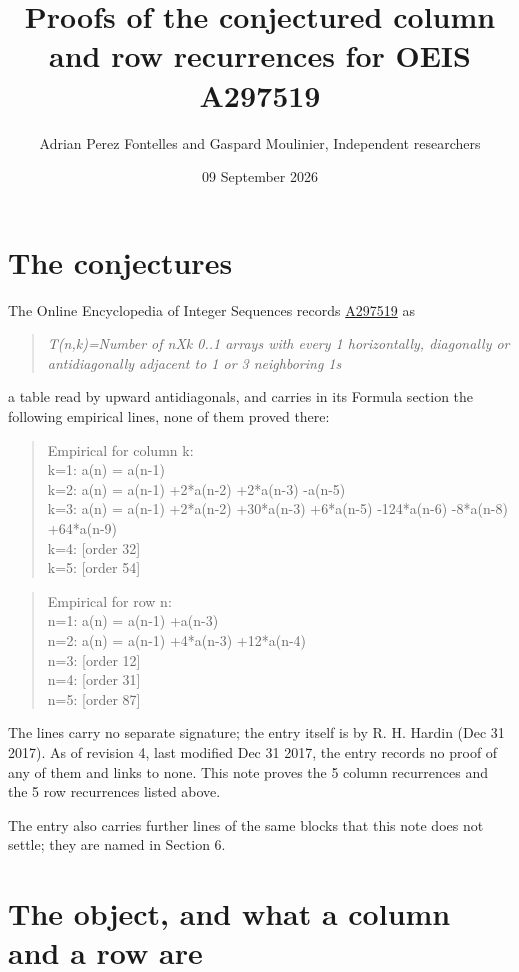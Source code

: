 \documentclass[11pt]{article}
\title{Proofs of the conjectured column and row recurrences for OEIS A297519}
\author{Adrian Perez Fontelles and Gaspard Moulinier, Independent researchers}
\date{09 September 2026}
\theoremstyle{definition}
\begin{document}
\maketitle
\section{The conjectures}

The Online Encyclopedia of Integer Sequences records \href{https://oeis.org/A297519}{A297519} as

\begin{quote}\itshape T(n,k)=Number of nXk 0..1 arrays with every 1 horizontally, diagonally or antidiagonally adjacent to 1 or 3 neighboring 1s\end{quote}

a table read by upward antidiagonals, and carries in its Formula section the following empirical lines, none of them proved there:

\begin{quote}\ttfamily Empirical for column k:\\
k=1: a(n) = a(n-1)\\k=2: a(n) = a(n-1) +2*a(n-2) +2*a(n-3) -a(n-5)\\k=3: a(n) = a(n-1) +2*a(n-2) +30*a(n-3) +6*a(n-5) -124*a(n-6) -8*a(n-8) +64*a(n-9)\\k=4: [order 32]\\k=5: [order 54]\end{quote}

\begin{quote}\ttfamily Empirical for row n:\\
n=1: a(n) = a(n-1) +a(n-3)\\n=2: a(n) = a(n-1) +4*a(n-3) +12*a(n-4)\\n=3: [order 12]\\n=4: [order 31]\\n=5: [order 87]\end{quote}

The lines carry no separate signature; the entry itself is by R. H. Hardin (Dec 31 2017). As of revision 4, last modified Dec 31 2017, the entry records no proof of any of them and links to none. This note proves the 5 column recurrences and the 5 row recurrences listed above.

The entry also carries further lines of the same blocks that this note does not settle; they are named in Section 6.

\section{The object, and what a column and a row are}
\end{document}

